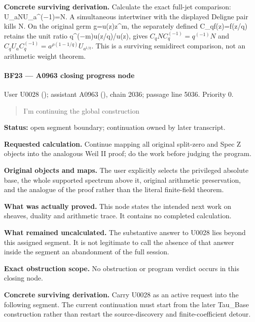 \textbf{Concrete surviving derivation.} Calculate the exact full-jet
comparison:
U\_aNU\_a\textasciicircum{}(\allowbreak{}\ensuremath{−}\allowbreak{}1)=N.
A simultaneous intertwiner with the displayed Deligne pair kills N. On
the original germ g=u(z)z\^{}m, the separately defined C\_qf(z)=f(z/q)
retains the unit ratio
q\textasciicircum{}(\allowbreak{}\ensuremath{−}\allowbreak{}m)u(z/q)/u(z),
gives \(C_qNC_q^{(-1)}=q^{(-1)}N\) and
\(C_qU_aC_q^{(-1)}=a^{\rho(1-1/q)}U_{a^{1/q}}\). This is a surviving
semidirect comparison, not an arithmetic weight theorem.

\paragraph{BF23 --- A0963 closing progress
node}\label{bf23-a0963-closing-progress-node}

User U0028 (\protect{});
assistant A0963 (\protect{}),
chain 2036; passage line 5036. Priority 0.

\begin{quote}
I'm continuing the global construction
\end{quote}

\textbf{Status:} open segment boundary; continuation owned by later
transcript.

\textbf{Requested calculation.} Continue mapping all original split-zero
and Spec Z objects into the analogous Weil II proof; do the work before
judging the program.

\textbf{Original objects and maps.} The user explicitly selects the
privileged absolute base, the whole supported spectrum above it,
original arithmetic preservation, and the analogue of the proof rather
than the literal finite-field theorem.

\textbf{What was actually proved.} This node states the intended next
work on sheaves, duality and arithmetic trace. It contains no completed
calculation.

\textbf{What remained uncalculated.} The substantive answer to U0028
lies beyond this assigned segment. It is not legitimate to call the
absence of that answer inside the segment an abandonment of the full
session.

\textbf{Exact obstruction scope.} No obstruction or program verdict
occurs in this closing node.

\textbf{Concrete surviving derivation.} Carry U0028 as an active request
into the following segment. The current continuation must start from the
later Tau\_Base construction rather than restart the source-discovery
and finite-coefficient detour.

